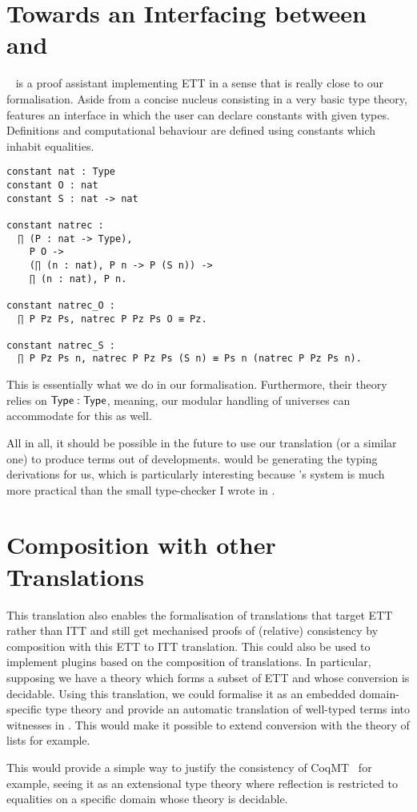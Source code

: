 \section{Towards an Interfacing between \Andromeda and \Coq}

\Andromeda~ is a proof assistant implementing \acrshort{ETT}
in a sense that is really close to our formalisation. Aside from a concise
nucleus consisting in a very basic type theory, \Andromeda features an interface
in which the user can declare constants with given types. Definitions and
computational behaviour are defined using constants which inhabit equalities.
\begin{verbatim}
constant nat : Type
constant O : nat
constant S : nat -> nat

constant natrec :
  ∏ (P : nat -> Type),
    P O ->
    (∏ (n : nat), P n -> P (S n)) ->
    ∏ (n : nat), P n.

constant natrec_O :
  ∏ P Pz Ps, natrec P Pz Ps O ≡ Pz.

constant natrec_S :
  ∏ P Pz Ps n, natrec P Pz Ps (S n) ≡ Ps n (natrec P Pz Ps n).
\end{verbatim}
This is essentially what we do in our formalisation.
Furthermore, their theory relies on $\mathsf{Type} : \mathsf{Type}$, meaning, our modular
handling of universes can accommodate for this as well.

All in all, it should be possible in the future to use our translation
(or a similar one) to produce \Coq terms out of \Andromeda developments.
\Andromeda would be generating the typing derivations for us, which is
particularly interesting because \Andromeda's system is much more practical
than the small type-checker I wrote in \Coq.

\section{Composition with other Translations}

This translation also enables the formalisation of translations that
target \acrshort{ETT} rather than \acrshort{ITT} and still get mechanised proofs
of (relative) consistency by composition with this \acrshort{ETT} to
\acrshort{ITT} translation.
This could also be used to implement plugins based on the composition of
translations. In particular, supposing we have a theory which forms a
subset of \acrshort{ETT} and whose conversion is decidable. Using this
translation, we could formalise it as an embedded domain-specific type theory
and provide an automatic translation of well-typed terms into witnesses in
\Coq. This would make it possible to extend conversion with the theory
of lists for example.

This would provide a simple way to justify the consistency of
\acrshort{CoqMT}~ for example, seeing it
as an extensional type theory where reflection is restricted to equalities on a
specific domain whose theory is decidable.